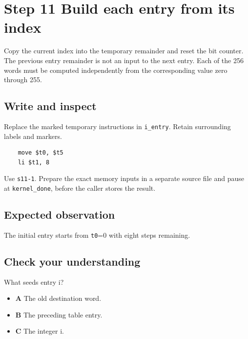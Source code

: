 \section{Step 11 Build each entry from its index}\label{crc-s11}

Copy the current index into the temporary remainder and reset the bit counter. The previous entry remainder is not an input to the next entry. Each of the 256 words must be computed independently from the corresponding value zero through 255.

\subsection{Write and inspect}
Replace the marked temporary instructions in \texttt{i\_entry}. Retain surrounding labels and markers.

\begin{verbatim}
    move $t0, $t5
    li $t1, 8
\end{verbatim}

Use \texttt{s11-1}. Prepare the exact memory inputs in a separate source file and pause at \texttt{kernel\_done}, before the caller stores the result.

\subsection{Expected observation}
The initial entry starts from \texttt{t0}=0 with eight steps remaining.

\subsection{Check your understanding}
What seeds entry i?

\begin{itemize}
  \item \textbf{A} The old destination word.
  \item \textbf{B} The preceding table entry.
  \item \textbf{C} The integer i.
\end{itemize}
